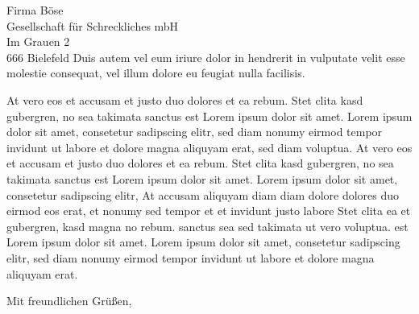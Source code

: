 \documentclass[%
   fontsize=10pt,%
   paper=a4,%
   enlargefirstpage=on,%
   pagenumber=headright,%
   headsepline=on,%
   parskip=half,%
   fromalign=right,%
   fromphone=on,%
   fromrule=off,%
   fromfax=off,%
   fromemail=on,%
   fromurl=on,%
   fromlogo=on,%
   addrfield=on,%
   backaddress=on,%
   subject=beforeopening,%
   locfield=wide,%
   foldmarks=on,%
   numericaldate=off,%
   refline=narrow,%
   draft=false%
]{scrlttr2}
\begin{document}
\begin{letter}{Firma Böse
\\ Gesellschaft für Schreckliches mbH
\\ Im Grauen 2
\\ 666 Bielefeld}
Duis autem vel eum iriure dolor in hendrerit in vulputate velit esse molestie consequat, vel illum dolore eu feugiat nulla facilisis.

At vero eos et accusam et justo duo dolores et ea rebum. Stet clita kasd gubergren, no sea takimata sanctus est Lorem ipsum dolor sit amet. Lorem ipsum dolor sit amet, consetetur sadipscing elitr, sed diam nonumy eirmod tempor invidunt ut labore et dolore magna aliquyam erat, sed diam voluptua. At vero eos et accusam et justo duo dolores et ea rebum. Stet clita kasd gubergren, no sea takimata sanctus est Lorem ipsum dolor sit amet. Lorem ipsum dolor sit amet, consetetur sadipscing elitr, At accusam aliquyam diam diam dolore dolores duo eirmod eos erat, et nonumy sed tempor et et invidunt justo labore Stet clita ea et gubergren, kasd magna no rebum. sanctus sea sed takimata ut vero voluptua. est Lorem ipsum dolor sit amet. Lorem ipsum dolor sit amet, consetetur sadipscing elitr, sed diam nonumy eirmod tempor invidunt ut labore et dolore magna aliquyam erat.

\closing{Mit freundlichen Grüßen,}
\end{letter}
\end{document}
